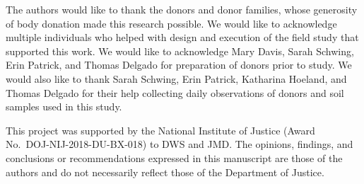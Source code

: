 \documentclass[
  10pt,
  letterpaper,
]{article}
\begin{document}
The authors would like to thank the donors and donor families, whose
generosity of body donation made this research possible. We would like
to acknowledge multiple individuals who helped with design and execution
of the field study that supported this work. We would like to
acknowledge Mary Davis, Sarah Schwing, Erin Patrick, and Thomas Delgado
for preparation of donors prior to study. We would also like to thank
Sarah Schwing, Erin Patrick, Katharina Hoeland, and Thomas Delgado for
their help collecting daily observations of donors and soil samples used
in this study.

This project was supported by the National Institute of Justice (Award
No.~DOJ-NIJ-2018-DU-BX-018) to DWS and JMD. The opinions, findings, and
conclusions or recommendations expressed in this manuscript are those of
the authors and do not necessarily reflect those of the Department of
Justice.
\end{document}
